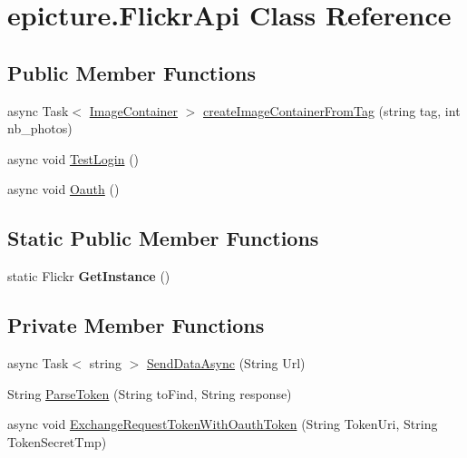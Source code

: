\hypertarget{classepicture_1_1_flickr_api}{}\section{epicture.\+Flickr\+Api Class Reference}
\label{classepicture_1_1_flickr_api}
\subsection*{Public Member Functions}
\begin{DoxyCompactItemize}
\item 
async Task$<$ \mbox{\hyperlink{classepicture_1_1_image_container}{Image\+Container}} $>$ \mbox{\hyperlink{classepicture_1_1_flickr_api_abd70a1f8fe82ddc219572058be51dd51}{create\+Image\+Container\+From\+Tag}} (string tag, int nb\+\_\+photos)
\item 
async void \mbox{\hyperlink{classepicture_1_1_flickr_api_a4e39f3d53b58577718284c284c34338b}{Test\+Login}} ()
\item 
async void \mbox{\hyperlink{classepicture_1_1_flickr_api_a148c12d8328b94be08a554a45a546fc1}{Oauth}} ()
\end{DoxyCompactItemize}
\subsection*{Static Public Member Functions}
\begin{DoxyCompactItemize}
\item 
\mbox{\label{classepicture_1_1_flickr_api_a387ed0b89c15b93cce6722bda643b92f}} 
static Flickr {\bfseries Get\+Instance} ()
\end{DoxyCompactItemize}
\subsection*{Private Member Functions}
\begin{DoxyCompactItemize}
\item 
async Task$<$ string $>$ \mbox{\hyperlink{classepicture_1_1_flickr_api_ae914f2cefba1eb20021af69115471626}{Send\+Data\+Async}} (String Url)
\item 
String \mbox{\hyperlink{classepicture_1_1_flickr_api_a9ab15abcbe6c3002eb753dd79aa587ae}{Parse\+Token}} (String to\+Find, String response)
\item 
async void \mbox{\hyperlink{classepicture_1_1_flickr_api_af613a836598d8cdccde548b2b4d16c5c}{Exchange\+Request\+Token\+With\+Oauth\+Token}} (String Token\+Uri, String Token\+Secret\+Tmp)
\end{DoxyCompactItemize}
